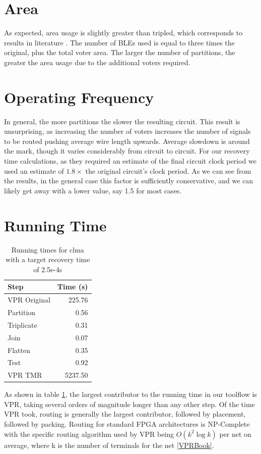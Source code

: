 \documentclass[12pt,final,oneside]{dwThesis} %
\begin{document}
   \section{Area}
   As expected, area usage is slightly greater than tripled,
   which corresponds to results in literature \cite{HardeningTechniques}. The
   number of \glspl{BLE} used is equal to three times the original, plus the
   total voter area. The larger the number of partitions, the greater the area
   usage due to the additional voters required.


   \section{Operating Frequency}
   In general, the more partitions the slower the
   resulting circuit. This result is unsurprising, as increasing the number of
   voters increases the number of signals to be routed pushing average wire
   length upwards. Average slowdown is around the  mark, though
   it varies considerably from circuit to circuit.  For our recovery time
   calculations, as they required an estimate of the final circuit clock period
   we used an estimate of $1.8\times$ the original circuit's clock period. As
   we can see from the results, in the general case this factor is sufficiently
   conservative, and we can likely get away with a lower value, say 1.5 for
   most cases.


   \section{Running Time}\label{timing}
   
   \begin{table}
   \begin{tabular}{lr}
	\toprule
   	Step & Time (s) \\
   	\midrule
   	VPR Original & 225.76\\
   	Partition & 0.56 \\
   	Triplicate & 0.31 \\
   	Join & 0.07 \\
   	Flatten & 0.35 \\
   	Test & 0.92 \\
   	VPR TMR & 5237.50\\
   	\bottomrule
   \end{tabular}
   \caption{Running times for clma with a target recovery time of 2.5e-4s}\label{runningtimes}
   \end{table}
   As shown in table \ref{runningtimes}, the largest contributor to the running time in our toolflow is \gls{VPR}, taking several orders of magnitude longer than any other step. Of the time \gls{VPR} took, routing is generally the largest contributor, followed by placement, followed by packing.
   Routing for standard \gls{FPGA} architectures is NP-Complete \cite{npcomplete} with the specific routing algorithm used by \gls{VPR} being $O(k^2\log{k})$ per net on average,
   where k is the number of terminals for the net \ref{VPRBook}.
   
\end{document}
